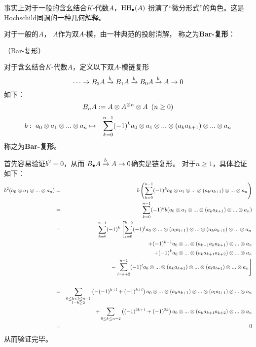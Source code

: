 事实上对于一般的含幺结合$K$-代数$A$，$\operatorname{HH}_{\bullet}(A)$
扮演了“微分形式”的角色。这是Hochschild同调的一种几何解释。\vs

对于一般的$A$，
$A$作为双$A$-模，由一种典范的投射消解，
称之为\textbf{Bar-复形}：

\begin{definition}（Bar-复形）

对于含幺结合$K$-代数$A$，定义以下双$A$-模链复形
$$\cdots\to B_2A\xrightarrow{b}B_1A\xrightarrow{b}B_0A\xrightarrow{b}A\to 0$$
如下：
$$B_nA:=A\otimes A^{\otimes n}\otimes A\,\,\,(n\geq 0)$$
\begin{eqnarray*}
b:\,\,a_0\otimes a_1\otimes...\otimes a_n
&\mapsto&
\sum_{k=0}^{n-1}(-1)^k
      a_0\otimes a_1\otimes...\otimes(a_{k}a_{k+1})\otimes...\otimes a_n
\end{eqnarray*}
称之为\textbf{Bar-复形}。
\end{definition}

首先容易验证$b^2=0$，从而
$B_{\bullet} A\xrightarrow{b} A\to 0$确实是链复形。
对于$n\geq 1$，具体验证如下：
\begin{eqnarray*}
    b^2(a_0\otimes a_1\otimes...\otimes a_n)
&=& b\left(
         \sum_{k=0}^{n-1}(-1)^k
             a_0\otimes a_1
             \otimes...\otimes(a_{k}a_{k+1})
             \otimes...\otimes a_n
     \right)\\
&=&  \sum_{k=0}^{n-1}(-1)^k
             b(a_0\otimes a_1
             \otimes...\otimes(a_{k}a_{k+1})
             \otimes...\otimes a_n)\\
&=&  \sum_{k=0}^{n-1}(-1)^k
         \left[
             \sum_{l=0}^{k-2}(-1)^l
                  a_0\otimes...\otimes(a_{l}a_{l+1})
                  \otimes...\otimes(a_{k}a_{k+1})
                  \otimes...\otimes a_n
         \right.\\
&&+  (-1)^{k-1}
      a_0\otimes...\otimes(a_{k-1}a_{k}a_{k+1})
                  \otimes...\otimes a_n\\
&&+
     (-1)^{k}
      a_0\otimes...\otimes(a_{k}a_{k+1}a_{k+2})
                  \otimes...\otimes a_n\\
&&-\left.
             \sum_{l=k+2}^{n-1}(-1)^l
                  a_0\otimes...\otimes(a_{k}a_{k+1})
                  \otimes...\otimes(a_{l}a_{l+1})
                  \otimes...\otimes a_n
    \right]\\
&&\\
&=&  \sum_{\substack{0\leq k<l\leq n-1\\ l-k\geq 2}}
         \left(-(-1)^{k+l}+(-1)^{k+l}\right)
         a_0\otimes...\otimes(a_{k}a_{k+1})
                  \otimes...\otimes(a_{l}a_{l+1})
                  \otimes...\otimes a_n\\
&&+  \sum_{0\leq k\leq n-2}
         \left((-1)^{2k+1}+(-1)^{2k}\right)
             a_0\otimes...\otimes(a_{k}a_{k+1}a_{k+2})
                  \otimes...\otimes a_n\\
&=&0
\end{eqnarray*}
从而验证完毕。


